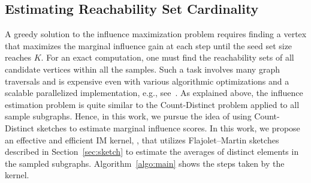 \documentclass[10pt,journal,compsoc]{IEEEtran}
\newcommand\acro{{\sc{HyperFuseR\xspace}\xspace}\xspace}
\begin{document}
\subsection{Estimating Reachability Set Cardinality}
A greedy solution to the influence maximization problem requires finding a vertex that maximizes the marginal influence gain at each step until the seed set size reaches $K$. For an exact computation, one must find the reachability sets of all candidate vertices within all the samples. Such a task involves many graph traversals and is expensive even with various algorithmic optimizations and a scalable parallelized implementation, e.g., see~\cite{infuser}. As explained above, the influence estimation problem is quite similar to the Count-Distinct problem applied to all sample subgraphs. Hence, in this work, we pursue the idea of using Count-Distinct sketches to estimate marginal influence scores. In this work, we propose an effective and efficient IM kernel, \acro, that utilizes Flajolet–Martin sketches described in Section~\ref{sec:sketch} to estimate the averages of distinct elements in the sampled subgraphs. Algorithm~\ref{algo:main} shows the steps taken by the kernel.
\end{document}

